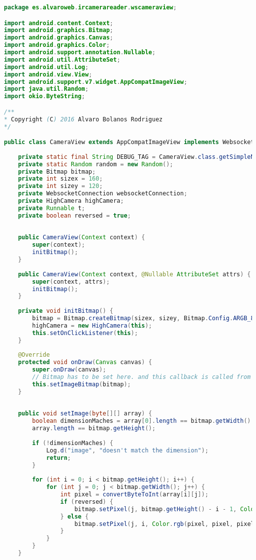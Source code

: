 \documentclass[hidelinks,11pt,a4paper,oneside,article]{memoir}
\begin{document}
\begin{lstlisting}[label={listing:cameraview},caption={CameraView class, extending ImageView},language=Java, style=styleprogrammingappendix]
package es.alvaroweb.ircamerareader.wscameraview;

import android.content.Context;
import android.graphics.Bitmap;
import android.graphics.Canvas;
import android.graphics.Color;
import android.support.annotation.Nullable;
import android.util.AttributeSet;
import android.util.Log;
import android.view.View;
import android.support.v7.widget.AppCompatImageView;
import java.util.Random;
import okio.ByteString;

/**
* Copyright (C) 2016 Alvaro Bolanos Rodriguez
*/

public class CameraView extends AppCompatImageView implements WebsocketConnection.OnReceiveRow, HighCamera.FrameCallback, View.OnClickListener {
    
    private static final String DEBUG_TAG = CameraView.class.getSimpleName();
    private static Random random = new Random();
    private Bitmap bitmap;
    private int sizex = 160;
    private int sizey = 120;
    private WebsocketConnection websocketConnection;
    private HighCamera highCamera;
    private Runnable t;
    private boolean reversed = true;
    
    
    public CameraView(Context context) {
        super(context);
        initBitmap();
    }
    
    public CameraView(Context context, @Nullable AttributeSet attrs) {
        super(context, attrs);
        initBitmap();
    }
    
    private void initBitmap() {
        bitmap = Bitmap.createBitmap(sizex, sizey, Bitmap.Config.ARGB_8888);
        highCamera = new HighCamera(this);
        this.setOnClickListener(this);
    }
    
    @Override
    protected void onDraw(Canvas canvas) {
        super.onDraw(canvas);
        // Bitmap has to be set here. and this callback is called from UI
        this.setImageBitmap(bitmap);
    }
    
    
    public void setImage(byte[][] array) {
        boolean dimensionMaches = array[0].length == bitmap.getWidth() &&
        array.length == bitmap.getHeight();
        
        if (!dimensionMaches) {
            Log.d("image", "doesn't match the dimension");
            return;
        }
        
        for (int i = 0; i < bitmap.getHeight(); i++) {
            for (int j = 0; j < bitmap.getWidth(); j++) {
                int pixel = convertByteToInt(array[i][j]);
                if (reversed) {
                    bitmap.setPixel(j, bitmap.getHeight() - i - 1, Color.rgb(pixel, pixel, pixel));
                } else {
                    bitmap.setPixel(j, i, Color.rgb(pixel, pixel, pixel));
                }
            }
        }
    }
    

\end{lstlisting}
\end{document}
